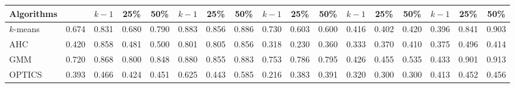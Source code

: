 \documentclass[preprint,12pt]{elsarticle}
\begin{document}
\begin{landscape}
\begin{table}[h!]
{\begin{tabular}{l c ccc ccc ccc ccc ccc}
\cmidrule(lr){3-5}
\cmidrule(lr){6-8}
\cmidrule(lr){9-11}
\cmidrule(lr){12-14}
\cmidrule(lr){15-17}

\textbf{Algorithms} & & \textbf{$k-1$} & \textbf{25\%} & \textbf{50\%}
& \textbf{$k-1$} & \textbf{25\%} & \textbf{50\%}
& \textbf{$k-1$} & \textbf{25\%} & \textbf{50\%}
& \textbf{$k-1$} & \textbf{25\%} & \textbf{50\%}
& \textbf{$k-1$} & \textbf{25\%} & \textbf{50\%} \\
\midrule
$k$-means & 0.674 & 0.831 & 0.680 & 0.790 & 0.883 & 0.856 & 0.886 & 0.730 & 0.603 & 0.600 & 0.416 & 0.402 & 0.420 & 0.396 & 0.841 & 0.903 \\
AHC & 0.420 & 0.858 & 0.481 & 0.500 & 0.801 & 0.805 & 0.856 & 0.318 & 0.230 & 0.360 & 0.333 & 0.370 & 0.410 & 0.375 & 0.496 & 0.414 \\
GMM & 0.720 & 0.868 & 0.800 & 0.848 & 0.880 & 0.855 & 0.883 & 0.753 & 0.786 & 0.795 & 0.426 & 0.455 & 0.535 & 0.433 & 0.901 & 0.913 \\
OPTICS & 0.393 & 0.466 & 0.424 & 0.451 & 0.625 & 0.443 & 0.585 & 0.216 & 0.383 & 0.391 & 0.320 & 0.300 & 0.300 & 0.413 & 0.452 & 0.456 \\
\bottomrule
\end{tabular}
}
\end{table}
\end{landscape}
\end{document}

